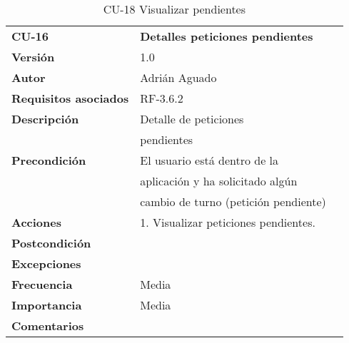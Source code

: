 \begin{table}
\begin{tabular}{llr}  
\toprule
\begin{minipage}[b]{0.24\columnwidth}\raggedright\strut
\textbf{CU-16}\strut
\end{minipage} & \begin{minipage}[b]{0.72\columnwidth}\raggedright\strut
\textbf{Detalles peticiones pendientes}\strut
\end{minipage}\tabularnewline
\cmidrule(r){1-2}
\textbf{Versión}       & 1.0           \\
\textbf{Autor}       & Adrián  Aguado    \\
\textbf{Requisitos asociados}       & RF-3.6.2  \\
\textbf{Descripción} & Detalle de peticiones \\
& pendientes \\
\textbf{Precondición}  & El usuario está dentro de la \\
& aplicación y ha solicitado algún   \\
& cambio de turno (petición pendiente)   \\
\textbf{Acciones} & 1. Visualizar peticiones pendientes. \\
\textbf{Postcondición} &  \\
\textbf{Excepciones} &     \\
\textbf{Frecuencia} & Media          \\
\textbf{Importancia} & Media           \\
\textbf{Comentarios } &   \\
\bottomrule
\end{tabular}
\caption{CU-18 Visualizar pendientes} 
\end{table}


